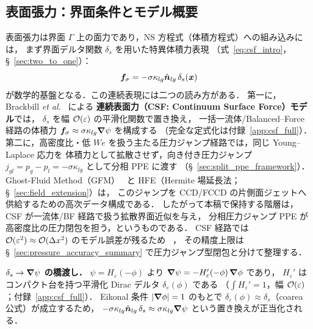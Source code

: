 %
%
\subsection{表面張力：界面条件とモデル概要}
\label{sec:csf}

表面張力は界面 $\Gamma$ 上の面力であり，NS 方程式（体積方程式）への組み込みには，
まず界面デルタ関数 $\delta_s$ を用いた特異体積力表現
（式~\eqref{eq:csf_intro}，§~\ref{sec:two_to_one}）：
\begin{equation*}
  \bm{f}_\sigma = -\sigma\kappa_{lg}\hat{\bm n}_{lg}\,\delta_s(\bm{x})
\end{equation*}
が数学的基盤となる．この連続表現には二つの読み方がある．
第一に，Brackbill \textit{et al.}~\cite{Brackbill1992} による
\textbf{連続表面力（CSF: Continuum Surface Force）モデル}では，
$\delta_s$ を幅 $\mathcal{O}(\varepsilon)$ の平滑化関数で置き換え，
一括一流体/Balanced--Force 経路の体積力
$\bm{f}_\sigma \approx \sigma\kappa_{lg}\bm{\nabla}\psi$ を構成する
（完全な定式化は付録~\ref{app:csf_full}）．
第二に，高密度比・低 $We$ を扱う主たる圧力ジャンプ経路では，同じ Young--Laplace 応力を
体積力として拡散させず，向き付き圧力ジャンプ
$j_{gl}=p_g-p_l=-\sigma\kappa_{lg}$ として分相 PPE に渡す
（§~\ref{sec:split_ppe_framework}）．
Ghost-Fluid Method（GFM）~\cite{Fedkiw1999, Kang2000} と
HFE（Hermite 場延長法；§~\ref{sec:field_extension}）は，
このジャンプを CCD/FCCD の片側面ジェットへ供給するための高次データ構成である．
したがって本稿で保持する階層は，
CSF が一流体/BF 経路で扱う拡散界面近似を与え，
分相圧力ジャンプ PPE が高密度比の圧力閉包を担う，というものである．
CSF 経路では $\mathcal{O}(\varepsilon^2) \approx \mathcal{O}(\Delta x^2)$ のモデル誤差が残るため
~\cite{Popinet2009, Francois2006}，
その精度上限は §~\ref{sec:pressure_accuracy_summary} で圧力ジャンプ型閉包と分けて整理する．

\noindent\textbf{$\delta_s \to \bm{\nabla}\psi$ の橋渡し．}
$\psi = H_\varepsilon(-\phi)$ より $\bm{\nabla}\psi = -H_\varepsilon'(-\phi)\,\bm{\nabla}\phi$ であり，
$H_\varepsilon'$ はコンパクト台を持つ平滑化 Dirac デルタ $\delta_\varepsilon(\phi)$ である
（$\int H_\varepsilon' = 1$，幅 $\mathcal{O}(\varepsilon)$；付録~\ref{app:csf_full}）．
Eikonal 条件 $|\bm{\nabla}\phi| = 1$ のもとで
$\delta_\varepsilon(\phi) \approx \delta_s$（coarea 公式）が成立するため，
$-\sigma\kappa_{lg}\hat{\bm n}_{lg}\,\delta_s \approx \sigma\kappa_{lg}\bm{\nabla}\psi$ という置き換えが正当化される．

